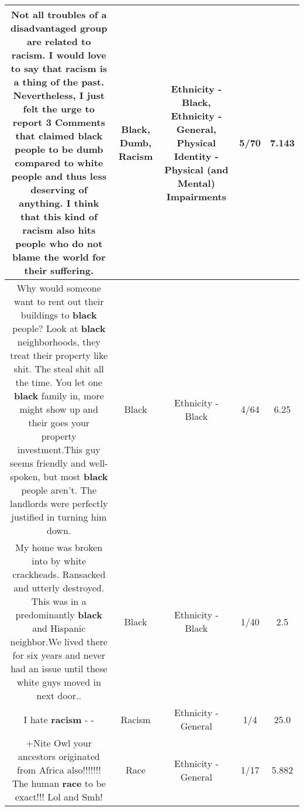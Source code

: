 \documentclass[11pt]{article}
\newlength\mylength
\begin{document}
\begin{center}
\begin{longtable}{|C{.65\mylength}|C{.30\mylength}|C{.12\mylength}|C{.12\mylength}|C{.12\mylength}|}
  \small Not all troubles of a disadvantaged group are related to \textbf{racism}. I would love to say that \textbf{racism} is a thing of the past. Nevertheless, I just felt the urge to report 3 Comments that claimed \textbf{black} people to be \textbf{dumb} compared to white people and thus less deserving of anything. I think that this kind of \textbf{racism} also hits people who do not blame the world for their suffering.\normalsize   & Black, Dumb, Racism & Ethnicity - Black, Ethnicity - General, Physical Identity - Physical (and Mental) Impairments & 5/70 & 7.143 \\  \hline
  \small Why would someone want to rent out their buildings to \textbf{black} people? Look at \textbf{black} neighborhoods, they treat their property like shit. The steal shit all the time. You let one \textbf{black} family in, more might show up and their goes your property investment.This guy seems friendly and well-spoken, but most \textbf{black} people aren't. The landlords were perfectly justified in turning him down.\normalsize   & Black & Ethnicity - Black & 4/64 & 6.25 \\  \hline
  \small My home was broken into by white crackheads. Ransacked and utterly destroyed. This was in a predominantly \textbf{black} and Hispanic neighbor.We lived there for six years and never had an issue until these white guys moved in next door..\normalsize   & Black & Ethnicity - Black & 1/40 & 2.5 \\  \hline
  \small I hate \textbf{racism} - -\normalsize   & Racism & Ethnicity - General & 1/4 & 25.0 \\  \hline
  \small +Nite Owl your ancestors originated from Africa also!!!!!!! The human \textbf{race} to be exact!!! Lol and Smh!\normalsize   & Race & Ethnicity - General & 1/17 & 5.882 \\  \hline

\end{longtable}
\end{center}
\end{document}
